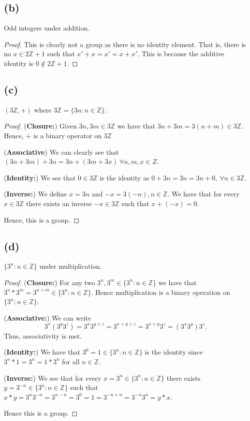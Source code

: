 \documentclass{article}
\newcommand{\Z}{\mathbb{Z}}
\begin{document}
\subsection*{(b)}
Odd integers under addition.
\begin{proof}
    This is clearly not a group as there is no identity element. That is, there is no
    $x \in 2\Z + 1$ such that $x' + x = x' = x + x'$. This is because the additive
    identity is $0 \notin 2\Z + 1$.
\end{proof}

\subsection*{(c)}
$(3\Z, +)$ where $3\Z = \{3n: n\in\Z\}$.
\begin{proof}
    (\textbf{Closure:})
    Given $3n, 3m \in 3\Z$ we have that $3n + 3m = 3(n + m) \in 3\Z$. Hence,
    $+$ is a binary operator on $3\Z$

    (\textbf{Associative}) We can clearly see that $(3n + 3m) + 3n = 3n + (3m + 3x) \ \forall n,m,x \in Z$.

    (\textbf{Identity:}) We see that $0 \in 3\Z$ is the identity as $0 + 3n = 3n = 3n + 0, \ \forall n \in 3\Z$.

    (\textbf{Inverse:}) We define $x = 3n$ and $-x = 3(-n), n \in \Z$.
    We have that for every $x \in 3\Z$ there exists an inverse $-x \in 3\Z$
    such that $x + (-x) = 0$.

    Hence, this is a group.
\end{proof}

\subsection*{(d)}
$\{3^n: n \in \Z\}$ under multiplication.
\begin{proof}
    (\textbf{Closure:})
    For any two $3^n, 3^m \in \{3^n: n \in \Z\}$ we have that
    $3^n*3^m = 3^{n+m} \in \{3^n: n \in \Z\}$. Hence multiplication is a binary
    operation on $\{3^n: n \in \Z\}$.

    (\textbf{Associative:})
    We can write
    \[3^x(3^y3^z) = 3^x3^{y+z} = 3^{x+y+z} = 3^{x+y}3^z =  (3^x3^y)3^z.\]
    Thus, associativity is met.

    (\textbf{Identity:})
    We have that $3^0 = 1 \in \{3^n: n \in \Z\}$ is the identity since $3^n * 1 = 3^n = 1*3^n$
    for all $n \in \Z$.

    (\textbf{Inverse:})
    We see that for every $x = 3^n \in \{3^n: n \in \Z\}$ there exists $y = 3^{-n} \in \{3^n: n \in \Z\}$
    such that $x*y = 3^n3^{-n} = 3^{n-n} = 3^0 = 1 = 3^{-n+n} = 3^{-n}3^n = y*x$.

    Hence this is a group.
\end{proof}
\end{document}

